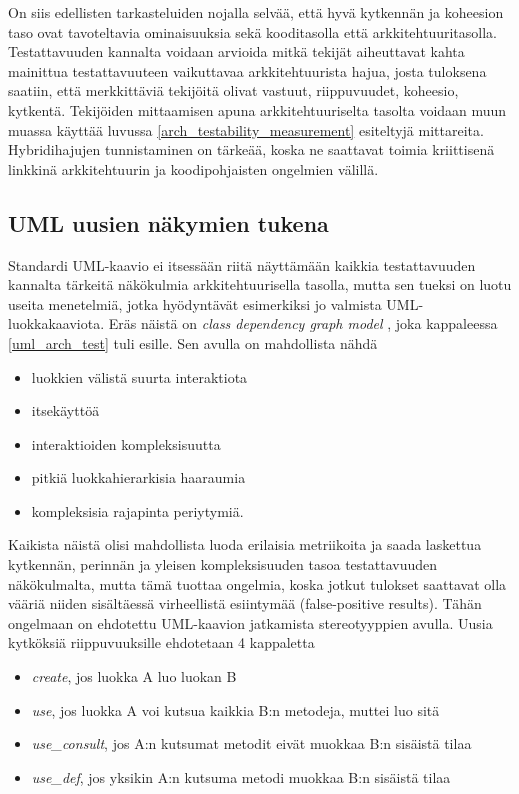 \documentclass[finnish]{tktltiki2}
\numberwithin{table}{section}
\theoremstyle{definition}
\theoremstyle{remark}
\begin{document}
On siis edellisten tarkasteluiden nojalla selvää, että hyvä kytkennän ja koheesion taso ovat tavoteltavia ominaisuuksia sekä kooditasolla että arkkitehtuuritasolla. Testattavuuden kannalta voidaan arvioida mitkä tekijät aiheuttavat kahta mainittua testattavuuteen vaikuttavaa arkkitehtuurista hajua, josta tuloksena saatiin, että merkkittäviä tekijöitä olivat vastuut, riippuvuudet, koheesio, kytkentä. Tekijöiden mittaamisen apuna arkkitehtuuriselta tasolta voidaan muun muassa käyttää luvussa \ref{arch_testability_measurement} esiteltyjä mittareita. Hybridihajujen tunnistaminen on tärkeää, koska ne saattavat toimia kriittisenä linkkinä arkkitehtuurin ja koodipohjaisten ongelmien välillä. 


\subsection{UML uusien näkymien tukena}


Standardi UML-kaavio ei itsessään riitä näyttämään kaikkia testattavuuden kannalta tärkeitä näkökulmia arkkitehtuurisella tasolla, mutta sen tueksi on luotu useita menetelmiä, jotka hyödyntävät esimerkiksi jo valmista UML-luokkakaaviota. Eräs näistä on \textit{class dependency graph model} \citep{baudry_testability_2002}, joka kappaleessa \ref{uml_arch_test} tuli esille. Sen avulla on mahdollista nähdä 

\begin{itemize}
	\item luokkien välistä suurta interaktiota
	\item itsekäyttöä
	\item interaktioiden kompleksisuutta
	\item pitkiä luokkahierarkisia haaraumia
	\item kompleksisia rajapinta periytymiä.
\end{itemize}

\noindent
Kaikista näistä olisi mahdollista luoda erilaisia metriikoita ja saada laskettua kytkennän, perinnän ja yleisen kompleksisuuden tasoa testattavuuden näkökulmalta, mutta tämä tuottaa ongelmia, koska jotkut tulokset saattavat olla vääriä niiden sisältäessä virheellistä esiintymää (false-positive results). Tähän ongelmaan on ehdotettu UML-kaavion jatkamista stereotyyppien avulla. Uusia kytköksiä riippuvuuksille ehdotetaan 4 kappaletta \citep[s. 4]{baudry_measuring_2003}

\begin{itemize}
	\item \textit{create}, jos luokka A luo luokan B
	\item \textit{use}, jos luokka A voi kutsua kaikkia B:n metodeja, muttei luo sitä
	\item \textit{use\_consult}, jos A:n kutsumat metodit eivät muokkaa B:n sisäistä tilaa
	\item \textit{use\_def}, jos yksikin A:n kutsuma metodi muokkaa B:n sisäistä tilaa
\end{itemize}
\end{document}
